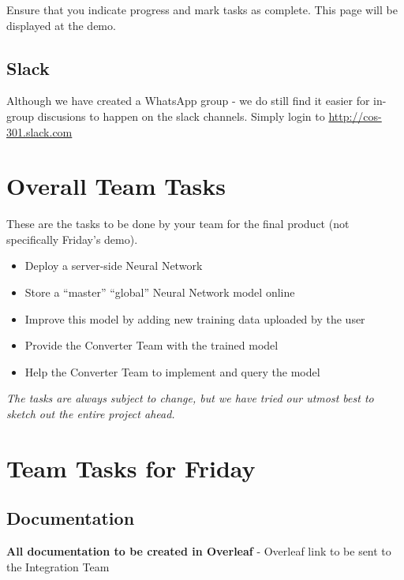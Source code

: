 \documentclass{article}
\begin{document}
Ensure that you indicate progress and mark tasks as complete. This page will be displayed at the demo.

\subsection{Slack}
Although we have created a WhatsApp group - we do still find it easier for in-group discusions to happen on the slack channels. Simply login to \url{http://cos-301.slack.com}

\newpage

\section{Overall Team Tasks}
These are the tasks to be done by your team for the final product (not specifically Friday's demo).

\begin{itemize}
    \item Deploy a server-side Neural Network
    \item Store a “master” “global” Neural Network model online
    \item Improve this model by adding new training data uploaded by the user
    \item Provide the Converter Team with the trained model
    \item Help the Converter Team to implement and query the model

\end{itemize}

\vspace{1cm}

\begin{center}
   \textit{The tasks are always subject to change, but we have tried our utmost best to sketch out the entire project ahead.}
\end{center}

\newpage


\section{Team Tasks for Friday}

\subsection{Documentation}
\textbf{All documentation to be created in Overleaf} - Overleaf link to be sent to the Integration Team
\end{document}
